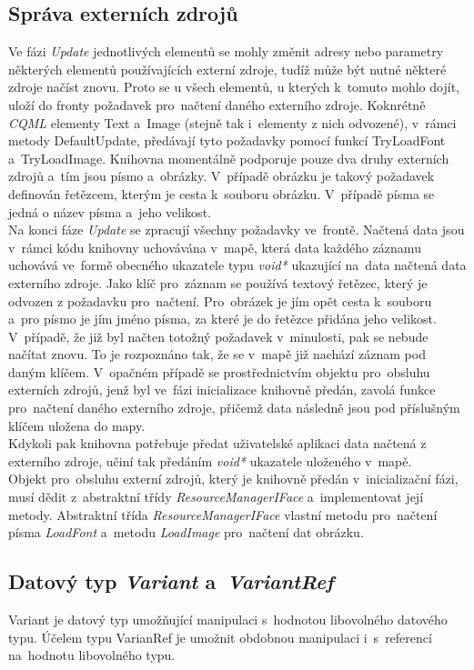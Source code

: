 \documentclass[11pt,twoside,a4paper]{book}
\begin{document}
\subsection{\label{SEC:ext}Správa externích zdrojů}
Ve fázi \textit{Update} jednotlivých elementů se mohly změnit adresy nebo parametry některých elementů používajících externí zdroje, tudíž může být nutné některé zdroje načíst znovu. Proto se u všech elementů, u kterých k~tomuto mohlo dojít, uloží do fronty požadavek pro~načtení daného externího zdroje. Koknrétně \textit{CQML} elementy Text a~Image (stejně tak i~elementy z nich odvozené), v~rámci metody DefaultUpdate, předávají tyto požadavky pomocí funkcí TryLoadFont a~TryLoadImage. Knihovna momentálně podporuje pouze dva druhy externích zdrojů a~tím jsou písmo a~obrázky. V~případě obrázku je takový požadavek definován řetězcem, kterým je cesta k~souboru obrázku. V~případě písma se jedná o název písma a~jeho velikost. \\
Na konci fáze \textit{Update} se zpracují všechny požadavky ve~frontě. Načtená data jsou v~rámci kódu knihovny uchovávána v~mapě, která data každého záznamu uchovává ve~formě obecného ukazatele typu \textit{void*} ukazující na~data načtená data externího zdroje. Jako klíč pro~záznam se používá textový řetězec, který je odvozen z požadavku pro~načtení. Pro~obrázek je jím opět cesta k~souboru a~pro písmo je jím jméno písma, za které je do řetězce přidána jeho velikost. V~případě, že již byl načten totožný požadavek v~minulosti, pak se nebude načítat znovu. To je rozpoznáno tak, že se v~mapě již nachází záznam pod daným klíčem. V~opačném případě se prostřednictvím objektu pro~obsluhu externích zdrojů, jenž byl ve~fázi inicializace knihovně předán, zavolá funkce pro~načtení daného externího zdroje, přičemž data následně jsou pod příslušným klíčem uložena do mapy.\\
Kdykoli pak knihovna potřebuje předat uživatelské aplikaci data načtená z externího zdroje, učiní tak předáním \textit{void*} ukazatele uloženého v~mapě.\\
Objekt pro~obsluhu externí zdrojů, který je knihovně předán v~inicializační fázi, musí dědit z~abstraktní třídy \textit{ResourceManagerIFace} a~implementovat její metody. Abstraktní třída \textit{ResourceManagerIFace} vlastní metodu pro~načtení písma \textit{LoadFont} a~metodu \textit{LoadImage} pro~načtení dat obrázku.

\subsection{Datový typ \textit{Variant} a~\textit{VariantRef}}
Variant je datový typ umožňující manipulaci s~hodnotou libovolného datového typu. Účelem typu VarianRef je umožnit obdobnou manipulaci i~s~referencí na~hodnotu libovolného typu.\\
\end{document}
